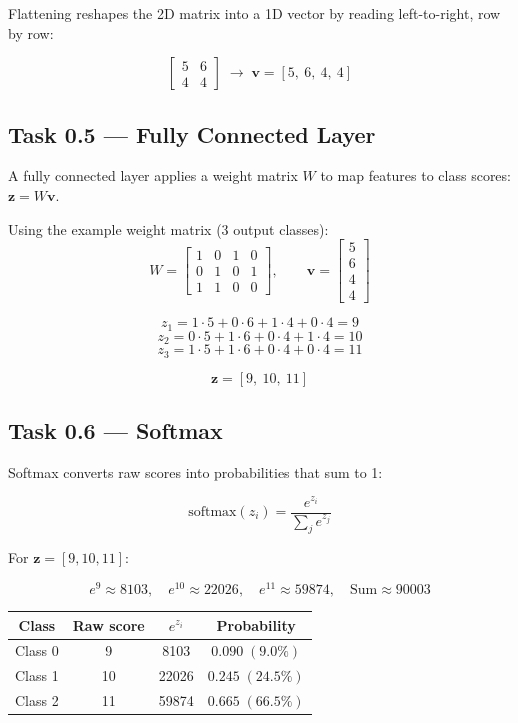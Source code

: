 \documentclass[12pt,a4paper]{article}
\begin{document}
Flattening reshapes the 2D matrix into a 1D vector by reading
left-to-right, row by row:

\[
\begin{bmatrix}5 & 6\\4 & 4\end{bmatrix}
\;\longrightarrow\;
\mathbf{v} = [5,\ 6,\ 4,\ 4]
\]

\subsection{Task 0.5 — Fully Connected Layer}

A fully connected layer applies a weight matrix $W$ to map features to
class scores: $\mathbf{z} = W\mathbf{v}$.

Using the example weight matrix (3 output classes):
\[
W =
\begin{bmatrix}
1 & 0 & 1 & 0\\
0 & 1 & 0 & 1\\
1 & 1 & 0 & 0
\end{bmatrix},
\qquad
\mathbf{v} =
\begin{bmatrix}5\\6\\4\\4\end{bmatrix}
\]

\[
z_1 = 1{\cdot}5 + 0{\cdot}6 + 1{\cdot}4 + 0{\cdot}4 = 9
\]
\[
z_2 = 0{\cdot}5 + 1{\cdot}6 + 0{\cdot}4 + 1{\cdot}4 = 10
\]
\[
z_3 = 1{\cdot}5 + 1{\cdot}6 + 0{\cdot}4 + 0{\cdot}4 = 11
\]

\[
\mathbf{z} = [9,\ 10,\ 11]
\]

\subsection{Task 0.6 — Softmax}

Softmax converts raw scores into probabilities that sum to 1:

\[
\text{softmax}(z_i) = \frac{e^{z_i}}{\displaystyle\sum_{j} e^{z_j}}
\]

For $\mathbf{z} = [9, 10, 11]$:

\[
e^9 \approx 8103, \quad e^{10} \approx 22026, \quad e^{11} \approx 59874,
\quad \text{Sum} \approx 90003
\]

\begin{center}
\renewcommand{\arraystretch}{1.3}
\begin{tabular}{cccc}
\toprule
Class & Raw score & $e^{z_i}$ & Probability \\
\midrule
Class 0 & 9  & 8103  & $0.090\;(9.0\%)$  \\
Class 1 & 10 & 22026 & $0.245\;(24.5\%)$ \\
Class 2 & 11 & 59874 & $\mathbf{0.665\;(66.5\%)}$ \\
\bottomrule
\end{tabular}
\end{center}
\end{document}
